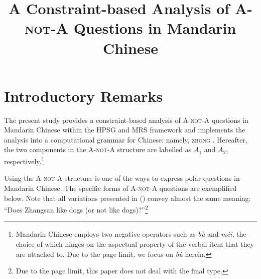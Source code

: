 \documentclass[11pt]{article}
\title{A Constraint-based Analysis of \textsc{A-not-A} Questions in Mandarin Chinese}
\date{}
\newcommand{\zhonglogo}{\texttt{\raisebox{0.4pt}{\scriptsize[}\raisebox{-0.5pt}{|}\raisebox{0.4pt}{\scriptsize]}}}
\newcommand{\zhong}{\textsc{zhong} {\zhonglogo}}
\def\anota{\textsc{A-not-A}}
\def\aone{$A_1$}
\def\atwo{$A_2$}
\newcommand{\myref}[1]{(\getref{#1})}
\begin{document}
\maketitle


\section{Introductory Remarks}
\label{sec:introduction}


The present study provides a constraint-based analysis of {\anota}
questions in Mandarin Chinese within the HPSG and MRS
\cite{pollard:sag:94,copestake:etal:05} framework and implements the
analysis into a computational grammar for Chinese: namely, \zhong.
Hereafter, the two components in the {\anota} structure are labelled
as {\aone} and {\atwo}, respectively.\footnote{Mandarin Chinese
  employs two negative operators such as \textit{b\`{u}} and
  \textit{m\'{e}i}, the choice of which hinges on the aspectual
  property of the verbal item that they are attached to. Due to the
  page limit, we focus on \textit{b\`{u}} herein.}


Using the {\anota} structure is one of the ways to express polar
questions in Mandarin Chinese.  The specific forms of {\anota}
questions are exemplified below.  Note that all variations presented
in \myref{exe:vnotv} convey almost the same meaning: ``Does Zhangsan
like dogs (or not like dogs)?''\footnote{Due to the page limit, this
  paper does not deal with the final type.}


{\small 
{}}
\vspace{-20pt}
\end{document}
